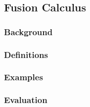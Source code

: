 \subsection{Fusion Calculus}

    \subsubsection{Background}
        \cite{fusion-calculus}


    \subsubsection{Definitions}


    \subsubsection{Examples}


    \subsubsection{Evaluation}

